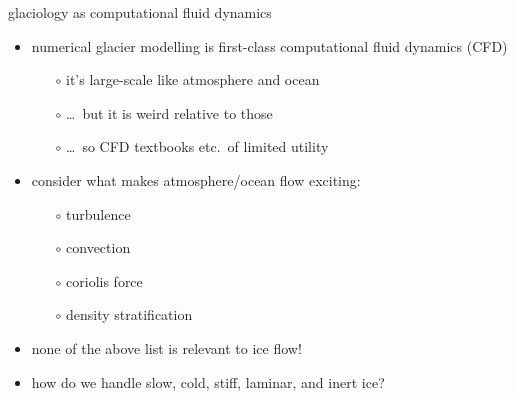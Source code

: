 \documentclass[10pt,dvipsnames]{beamer}
\begin{document}
\begin{frame}{glaciology as computational fluid dynamics}

\begin{itemize}
\item numerical glacier modelling is first-class computational fluid dynamics (CFD)
  \begin{itemize}
  \item[$\circ$] it's large-scale like atmosphere and ocean
  \item[$\circ$] \dots\, but it is weird relative to those
  \item[$\circ$] \dots\, so CFD textbooks etc.~of limited utility
  \end{itemize}
\item consider what makes atmosphere/ocean flow exciting:
  \begin{itemize}
  \item[$\circ$] turbulence
  \item[$\circ$] convection
  \item[$\circ$] coriolis force
  \item[$\circ$] density stratification
  \end{itemize}
\item none of the above list is relevant to ice flow!
\item how do we handle slow, cold, stiff, laminar, and inert ice?
\end{itemize}
\end{frame}
\end{document}
